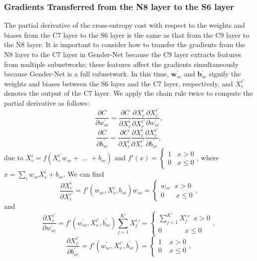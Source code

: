 \documentclass{sig-alternate-05-2015}
\begin{document}
\subsubsection{Gradients Transferred from the N8 layer to the S6 layer}
The partial derivative of the cross-entropy cost with respect to the weights and biases from the C7 layer to the S6 layer is the same as that from the C9 layer to the N8 layer. It is important to consider how to transfer the gradients from the N8 layer to the C7 layer in Gender-Net because the C9 layer extracts features from multiple subnetworks; these features affect the gradients simultaneously because Gender-Net is a full subnetwork. In this time, $\textbf{w}_{sc}^{'}$ and $\textbf{b}_{sc}^{'}$ signify the weights and biases between the S6 layer and the C7 layer, respectively, and $X_c^{i'}$ denotes the output of the C7 layer. We apply the chain rule twice to compute the partial derivative as follows:
\begin{equation}\label{}
\frac{{\partial C}}{{\partial w_{sc}^{'}}} = \frac{{\partial C}}{{\partial X_c^i}}\frac{{\partial X_c^i}}{{\partial X_c^{i'}}}\frac{{\partial X_c^{i'}}}{{\partial w_{sc}^{'}}},
\end{equation}
\begin{equation}\label{}
\frac{{\partial C}}{{\partial b_{sc}^{'}}} = \frac{{\partial C}}{{\partial X_c^i}}\frac{{\partial X_c^i}}{{\partial X_c^{i'}}}\frac{{\partial X_c^{i'}}}{{\partial b_{sc}^{'}}},
\end{equation}
due to $X_c^i = f(X_c^{i'}{w_{sc}} + \;...\; + {b_{sc}})$ and $f'(x) = \left\{ \begin{array}{l}
1\;\;\;x > 0\\
0\;\;\;x \le 0
\end{array} \right.$, where $x = \sum\limits_i {{w_{sc}}X_s^i}  + {b_{sc}}$. We can find
\begin{equation}\label{}
\frac{{\partial X_c^i}}{{\partial X_c^{i'}}} = f'\left( {{w_{sc}},X_s^i,{b_{sc}}} \right){w_{sc}} = \left\{ \begin{array}{l}
{w_{sc}}\;\;x > 0\\
0\;\;\;\;\;\;x \le 0
\end{array} \right.,
\end{equation}
and
\begin{equation}\label{}
\frac{{\partial X_c^{i'}}}{{\partial w_{sc}^{'}}} = f'(w_{sc}^{'},X_s^{i'},b_{sc}^{'})\sum\limits_{j = 1}^{K'} {X_j^i} ' = \left\{ \begin{array}{l}
\sum\limits_{j = 1}^{K'} {X_j^i} '\;\;x > 0\\
0\;\;\;\;\;\;\;\;\;\;\;\;x \le 0
\end{array} \right.,
\end{equation}
\begin{equation}\label{}
\frac{{\partial X_c^{i'}}}{{\partial b_{sc}^{'}}} = f'(w_{sc}^{'},X_s^{i'},b_{sc}^{'}) = \left\{ \begin{array}{l}
1\;\;\;\;x > 0\\
0\;\;\;\;x \le 0
\end{array} \right.,
\end{equation}
\end{document}
